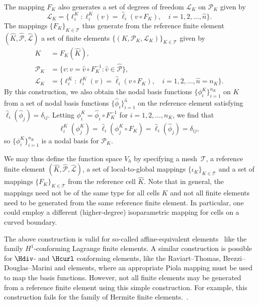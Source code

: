 The mapping $F_K$ also generates a set of degrees of freedom
$\mathcal{L}_K$ on $\mathcal{P}_K$ given by
\begin{equation}
  \mathcal{L}_K = \{ \ell^K_i : \ell^K_i(v) = \hat{\ell}_i(v \circ
  F_K), \quad i=1,2,\ldots,\hat{n} \}.
\end{equation}
The mappings $\{F_K\}_{K\in\mathcal{T}}$ thus generate from the
reference finite
element~$(\hat{K},\hat{\mathcal{P}},\hat{\mathcal{L}})$ a set of
finite elements
$\{(K,\mathcal{P}_K,\mathcal{L}_K)\}_{K\in\mathcal{T}}$ given by
\begin{equation} \label{eq:elementgeneration}
  \begin{split}
  K &= F_K(\hat{K}), \\
  \mathcal{P}_K &= \{ v : v = \hat{v} \circ F_K^{-1} : \hat{v} \in \hat{\mathcal{P}} \}, \\
  \mathcal{L}_K &= \{ \ell^K_i : \ell^K_i(v) = \hat{\ell}_i(v \circ F_K),
  \quad i=1,2,\ldots,\hat{n} = n_K \}.
  \end{split}
\end{equation}
By this construction, we also obtain the nodal basis functions
$\{\phi^K_i\}_{i=1}^{n_K}$ on $K$ from a set of nodal basis functions
$\{\hat{\phi}_i\}_{i=1}^{\hat{n}}$ on the reference element satisfying
$\hat{\ell}_i(\hat{\phi}_j) = \delta_{ij}$. Letting $\phi^K_i =
\hat{\phi}_i \circ F_K^{-1}$ for $i=1,2,\ldots,n_K$, we find that
\begin{equation}
  \ell^K_i(\phi^K_j) = \hat{\ell}_i(\phi^K_j \circ F_K) = \hat{\ell}_i(\hat{\phi}_j) = \delta_{ij},
\end{equation}
so $\{\phi^K_i\}_{i=1}^{n_K}$ is a nodal basis for $\mathcal{P}_K$.

We may thus define the function space $V_h$ by specifying a
mesh~$\mathcal{T}$, a reference finite element $(\hat{K},
\hat{\mathcal{P}}, \hat{\mathcal{L}})$, a set of local-to-global
mappings $\{\iota_K\}_{K\in\mathcal{T}}$ and a set of mappings
$\{F_K\}_{K\in\mathcal{T}}$ from the reference cell $\hat{K}$. Note
that in general, the mappings need not be of the same type for all
cells $K$ and not all finite elements need to be generated from the
same reference finite element. In particular, one could employ a
different (higher-degree) isoparametric mapping for cells on a curved
boundary.

The above construction is valid for so-called affine-equivalent
elements~\cite{BrennerScott2008} like the family $H^1$-conforming
Lagrange finite elements. A similar construction is possible for
$\Hdiv$- and $\Hcurl$ conforming elements, like the Raviart--Thomas,
Brezzi--Douglas--Marini and \nedelec{} elements, where an appropriate
Piola mapping must be used to map the basis functions. However, not
all finite elements may be generated from a reference finite element
using this simple construction. For example, this construction fails
for the family of Hermite finite
elements.~\cite{Ciarlet2002,BrennerScott2008}.

